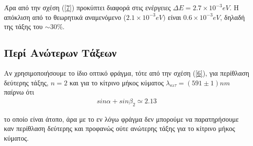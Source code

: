 \documentclass[a4paper]{article}
\begin{document}
%

Άρα από την σχέση (\ref{7}) προκύπτει διαφορά στις ενέργειες $\Delta E = 2.7\times10^{-3}eV$. Η απόκλιση από το θεωρητικά αναμενόμενο ($2.1\times10^{-3} eV)$ είναι $0.6\times10^{-3}eV$, δηλαδή της τάξης του $\sim30\%$.

\subsection*{Περί Ανώτερων Τάξεων}

	Αν χρησιμοποιήσουμε το ίδιο οπτικό φράγμα, τότε από την σχέση (\ref{6}), για περίθλαση δεύτερης τάξης, $n=2$ και για το κίτρινο μήκος κύματος $\lambda_{κιτ} = (591\pm1)nm$ παίρνω ότι 
	\begin{align*}
		sin\alpha + sin\beta_2 \simeq 2.13
	\end{align*}
 
 το οποίο είναι άτοπο, άρα με το εν λόγω φράγμα δεν μπορούμε να παρατηρήσουμε καν περίθλαση δεύτερης και προφανώς ούτε ανώτερης τάξης για το κίτρινο μήκος κύματος.
 
% 	
\end{document}
